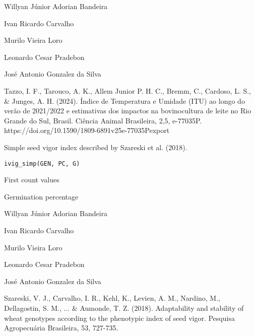 \documentclass[a4paper]{book}
\begin{document}
%
\begin{Author}
Willyan Júnior Adorian Bandeira

Ivan Ricardo Carvalho

Murilo Vieira Loro

Leonardo Cesar Pradebon

José Antonio Gonzalez da Silva
\end{Author}
%
\begin{References}
Tazzo, I. F., Tarouco, A. K., Allem Junior P. H. C., Bremm, C., Cardoso, L.
S., \& Junges, A. H. (2024). Índice de Temperatura e Umidade (ITU) ao longo do
verão de 2021/2022 e estimativas dos impactos na bovinocultura de leite no Rio
Grande do Sul, Brasil. Ciência Animal Brasileira, 2,5, e-77035P.
https://doi.org/10.1590/1809-6891v25e-77035Pexport
\end{References}
%
\begin{Description}
Simple seed vigor index described by Szareski et al. (2018).
\end{Description}
%
\begin{Usage}
\begin{verbatim}
ivig_simp(GEN, PC, G)
\end{verbatim}
\end{Usage}
%
\begin{Arguments}
\begin{ldescription}
\item[\code{PC}] First count values

\item[\code{G}] Germination percentage
\end{ldescription}
\end{Arguments}
%
\begin{Author}
Willyan Júnior Adorian Bandeira

Ivan Ricardo Carvalho

Murilo Vieira Loro

Leonardo Cesar Pradebon

José Antonio Gonzalez da Silva
\end{Author}
%
\begin{References}
Szareski, V. J., Carvalho, I. R., Kehl, K., Levien, A. M., Nardino,
M., Dellagostin, S. M., ... \& Aumonde, T. Z. (2018).
Adaptability and stability of wheat genotypes according to the
phenotypic index of seed vigor. Pesquisa Agropecuária Brasileira,
53, 727-735.
\end{References}
%
\begin{SeeAlso}
\end{SeeAlso}
\end{document}
